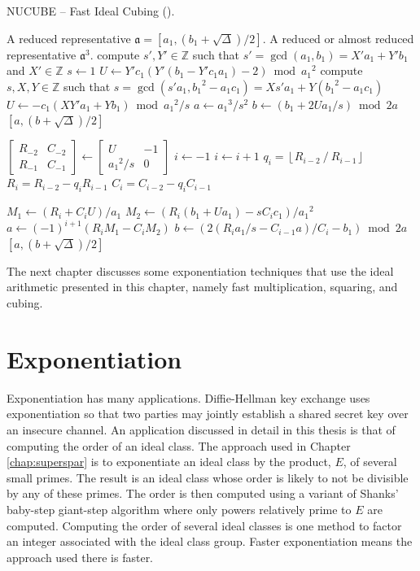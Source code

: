 \documentclass{ucalgthes1}
\theoremstyle{definition}
\newcommand{\ZZ}{\mathbb{Z}}
\newcommand{\matrixtt}[4]{\left[ \begin{array}{rr} #1 & #2 \\ #3 & #4 \end{array} \right]}
\newcommand{\floor}[1]{\left\lfloor #1 \right\rfloor}
\begin{document}
\begin{algorithm}[htb]
\caption{NUCUBE -- Fast Ideal Cubing (\cite[p.26]{Imbert2010}).}
\label{alg:nucube}
\begin{algorithmic}[1]
\Require A reduced representative $\mathfrak a = [a_1, (b_1+\sqrt\Delta)/2]$.
\Ensure A reduced or almost reduced representative $\mathfrak a^3$.
\State compute $s',Y' \in \ZZ$ such that $s' = \gcd(a_1, b_1) = X'a_1 + Y'b_1$ and $X' \in \ZZ$
	\State $s \gets 1$
	\State $U \gets Y'c_1(Y'(b_1 - Y'c_1a_1) - 2) \bmod {a_1}^2$
\Else
	\State compute $s, X, Y \in \ZZ$ such that $s = \gcd(s'a_1, {b_1}^2 - a_1c_1) = Xs'a_1 + Y({b_1}^2 - a_1c_1)$
	\State $U \gets -c_1(XY'a_1+Yb_1) \bmod {a_1}^2/s$
\EndIf
{}
	\State $a \gets {a_1}^3/s^2$
	\State $b \gets (b_1 + 2Ua_1/s) \bmod 2a$
	\State \Return $[a, (b+\sqrt\Delta)/2]$ 
\EndIf

\State $\matrixtt{R_{-2}}{C_{-2}}{R_{-1}}{C_{-1}} \gets \matrixtt{U}{-1}{{a_1}^2/s}{0}$
\State $i \gets -1$
	\State $i \gets i + 1$
	\State $q_i = \floor{R_{i-2} ~/~ R_{i-1}}$
	\State $R_i = R_{i-2}-q_i R_{i-1}$
	\State $C_i=C_{i-2}-q_i C_{i-1}$
\EndWhile

\State $M_1 \gets (R_i + C_iU) / a_1$
\State $M_2 \gets (R_i(b_1 + Ua_1) - sC_ic_1) / {a_1}^2$
\State $a \gets (-1)^{i+1} (R_i M_1 - C_i M_2)$
\State $b \gets (2(R_ia_1/s - C_{i-1}a)/C_i - b_1) \bmod 2a$
\State \Return $[a, (b+\sqrt\Delta)/2]$ 
\end{algorithmic}
\end{algorithm}

The next chapter discusses some exponentiation techniques that use the ideal arithmetic presented in this chapter, namely fast multiplication, squaring, and cubing.



\chapter{Exponentiation}
\label{chap:exponentiation}

Exponentiation has many applications. Diffie-Hellman key exchange uses exponentiation so that two parties may jointly establish a shared secret key over an insecure channel.  An application discussed in detail in this thesis is that of computing the order of an ideal class.  The approach used in Chapter \ref{chap:superspar} is to exponentiate an ideal class by the product, $E$, of several small primes.  The result is an ideal class whose order is likely to not be divisible by any of these primes.  The order is then computed using a variant of Shanks' baby-step giant-step algorithm where only powers relatively prime to $E$ are computed.  Computing the order of several ideal classes is one method to factor an integer associated with the ideal class group.  Faster exponentiation means the approach used there is faster.
\end{document}
